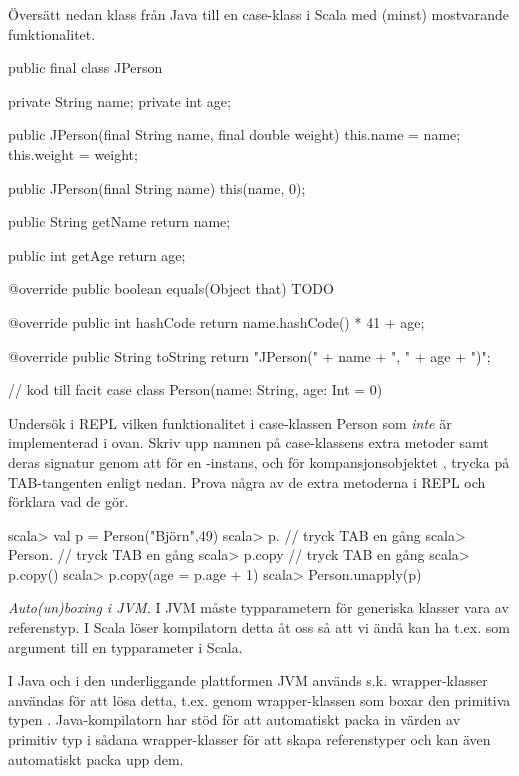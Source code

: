 \Subtask Översätt nedan klass  från Java till en case-klass  i Scala med (minst) mostvarande funktionalitet. 

\TODO
\begin{Code}[language=Java]
public final class JPerson {
    private String name;
    private int age;
  
    public JPerson(final String name, final double weight){
        this.name = name;
        this.weight = weight;
    }

    public JPerson(final String name){
        this(name, 0);
    }

    public String getName {
        return name;
    }
  
    public int getAge {
        return age;
    }
    
    @override
    public boolean equals(Object that){
       TODO
    }
    
    @override
    public int hashCode{
      return name.hashCode() * 41 + age;
    }

    @override
    public String toString {
      return "JPerson(" + name + ", " + age + ")";
    }
}
\end{Code}

\begin{Code}
// kod till facit
case class Person(name: String, age: Int = 0)
\end{Code}

\Subtask\Pen Undersök i REPL vilken funktionalitet i case-klassen Person som \emph{inte} är implementerad i  ovan. Skriv upp namnen på case-klassens extra metoder samt deras signatur genom att för en -instans, och för kompansjonsobjektet , trycka på TAB-tangenten enligt nedan. Prova några av de extra metoderna i REPL och förklara vad de gör.

\begin{REPL}
scala> val p = Person("Björn",49)
scala> p.      // tryck TAB en gång
scala> Person. // tryck TAB en gång
scala> p.copy  // tryck TAB en gång
scala> p.copy()
scala> p.copy(age = p.age + 1)
scala> Person.unapply(p)
\end{REPL}


\Task \emph{Auto(un)boxing i JVM.} I JVM måste typparametern för generiska klasser vara av referenstyp. I Scala löser kompilatorn detta åt oss så att vi ändå kan ha t.ex.  som argument till en typparameter i Scala. 

I Java och i den underliggande plattformen JVM används s.k. wrapper-klasser användas för att lösa detta, t.ex. genom wrapper-klassen  som boxar den primitiva typen . Java-kompilatorn har stöd för att automatiskt packa in värden av primitiv typ i sådana wrapper-klasser för att skapa referenstyper och kan även automatiskt packa upp dem. 

